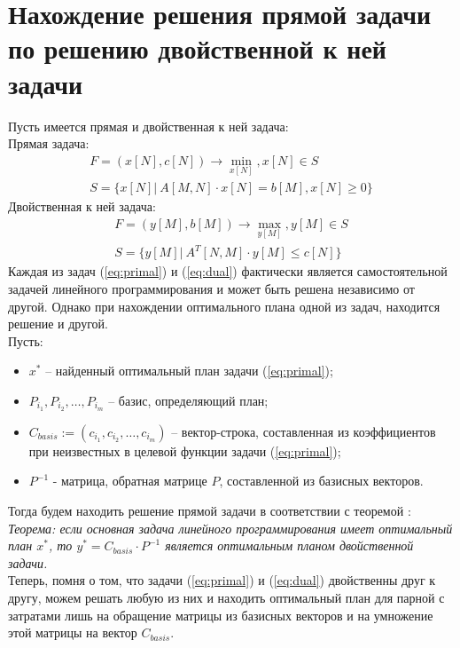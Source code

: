 \documentclass{article}
\begin{document}
\section {Нахождение решения прямой задачи по решению двойственной к ней задачи}
\noindent Пусть имеется прямая и двойственная к ней задача:\\
		Прямая задача:
		\begin{equation}\label{eq:primal}
		\begin{array}{ll}
		F = (x[N],c[N])\longrightarrow \min_{x[N]}, x[N] \in S\\
		S =\{x[N]|~A[M,N]\cdot x[N] = b[M], x[N] \ge 0\}
		\end{array}
		\end{equation}
		Двойственная к ней задача:
		\begin{equation}\label{eq:dual}
		\begin{array}{ll}
		F = (y[M],b[M])\longrightarrow \max_{y[M]}, y[M] \in S\\
		S =\{y[M]|~A^{T}[N,M]\cdot y[M] \le c[N]\}
		\end{array}
		\end{equation}
	Каждая из задач (\ref{eq:primal}) и (\ref{eq:dual}) фактически является самостоятельной задачей линейного программирования и может быть решена независимо от другой. Однако при нахождении оптимального плана одной из задач, находится решение и другой.\\
	\newline Пусть: \begin{itemize}
		\item $x^{*}$ -- найденный оптимальный план  задачи (\ref{eq:primal});
		\item $P_{i_1}, P_{i_2}, \ldots, P_{i_m}$ -- базис, определяющий план; \item $C_{basis} := (c_{i_1}, c_{i_2}, \ldots, c_{i_m})$ -- вектор-строка, составленная из коэффициентов при неизвестных в целевой функции задачи (\ref{eq:primal});
		\item $P^{-1}$ - матрица, обратная матрице $P$, составленной из базисных векторов.
	\end{itemize}
	Тогда будем находить решение прямой задачи в соответствии с теоремой \cite{akulich}:
	\newline \\
	\textit{Теорема: если основная задача линейного программирования имеет оптимальный план $x^{*}$, то $y^{*} = C_{basis}\cdot P^{-1}$ является оптимальным планом двойственной задачи.}
	\newline \\
	\noindent Теперь, помня о том, что задачи (\ref{eq:primal}) и (\ref{eq:dual}) двойственны друг к другу, можем решать любую из них и находить оптимальный план для парной с затратами лишь на обращение матрицы из базисных векторов и на умножение этой матрицы на вектор $C_{basis}$.
\end{document}
